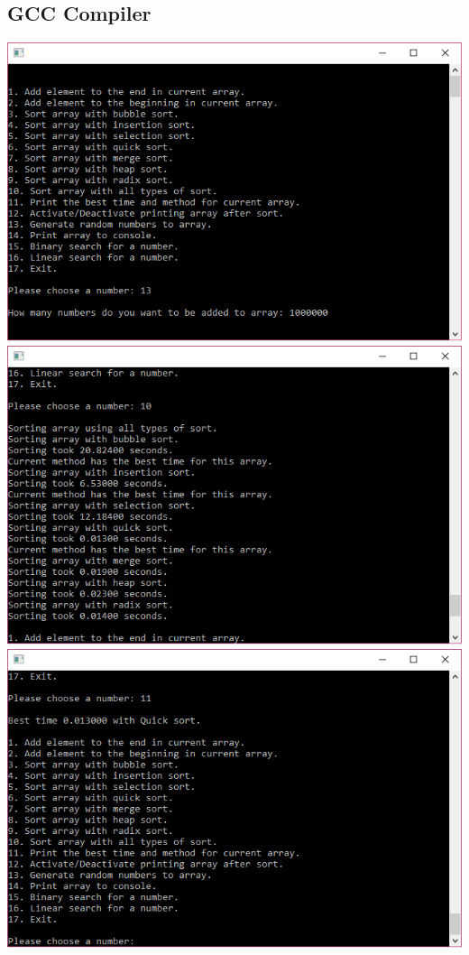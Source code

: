 \documentclass{article}
\begin{document}
\subsection{GCC Compiler}
\textbf{}
\begin{center}
\includegraphics[scale=0.90]{c1.png} \\
\includegraphics[scale=0.90]{c2.png} \\
\includegraphics[scale=0.90]{c3.png} \\

\end{center}
\end{document}
